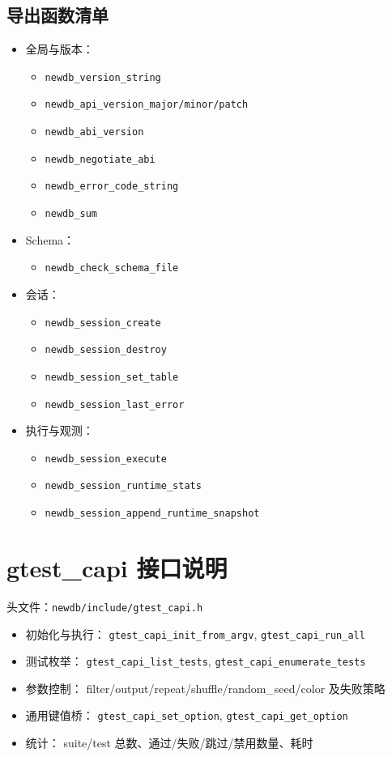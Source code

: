 \documentclass[11pt,a4paper]{ctexart}
\begin{document}
\subsection{导出函数清单}
\begin{itemize}
  \item 全局与版本：
  \begin{itemize}
    \item \texttt{newdb\_version\_string}
    \item \texttt{newdb\_api\_version\_major/minor/patch}
    \item \texttt{newdb\_abi\_version}
    \item \texttt{newdb\_negotiate\_abi}
    \item \texttt{newdb\_error\_code\_string}
    \item \texttt{newdb\_sum}
  \end{itemize}
  \item Schema：
  \begin{itemize}
    \item \texttt{newdb\_check\_schema\_file}
  \end{itemize}
  \item 会话：
  \begin{itemize}
    \item \texttt{newdb\_session\_create}
    \item \texttt{newdb\_session\_destroy}
    \item \texttt{newdb\_session\_set\_table}
    \item \texttt{newdb\_session\_last\_error}
  \end{itemize}
  \item 执行与观测：
  \begin{itemize}
    \item \texttt{newdb\_session\_execute}
    \item \texttt{newdb\_session\_runtime\_stats}
    \item \texttt{newdb\_session\_append\_runtime\_snapshot}
  \end{itemize}
\end{itemize}

\section{gtest\_capi 接口说明}
头文件：\texttt{newdb/include/gtest\_capi.h}

\begin{itemize}
  \item 初始化与执行：
  \texttt{gtest\_capi\_init\_from\_argv},
  \texttt{gtest\_capi\_run\_all}
  \item 测试枚举：
  \texttt{gtest\_capi\_list\_tests},
  \texttt{gtest\_capi\_enumerate\_tests}
  \item 参数控制：
  filter/output/repeat/shuffle/random\_seed/color 及失败策略
  \item 通用键值桥：
  \texttt{gtest\_capi\_set\_option},
  \texttt{gtest\_capi\_get\_option}
  \item 统计：
  suite/test 总数、通过/失败/跳过/禁用数量、耗时
\end{itemize}
\end{document}
